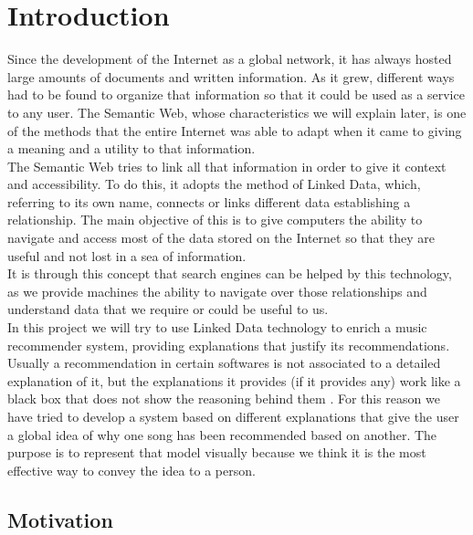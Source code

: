 \chapter{Introduction}
\label{cap:introduction}

Since the development of the Internet as a global network, it has always hosted large amounts of documents and written information. As it grew, different ways had to be found to organize that information so that it could be used as a service to any user. The Semantic Web, whose characteristics we will explain later, is one of the methods that the entire Internet was able to adapt when it came to giving a meaning and a utility to that information.\\

The Semantic Web tries to link all that information in order to give it context and accessibility. To do this, it adopts the method of Linked Data, which, referring to its own name, connects or links different data establishing a relationship. The main objective of this is to give computers the ability to navigate and access most of the data stored on the Internet so that they are useful and not lost in a sea of information.\\

It is through this concept that search engines can be helped by this technology, as we provide machines the ability to navigate over those relationships and understand data that we require or could be useful to us.\\

In this project we will try to use Linked Data technology to enrich a music recommender system, providing explanations that justify its recommendations.\\

Usually a recommendation in certain softwares is not associated to a detailed explanation of it, but the explanations it provides (if it provides any) work like a black box that does not show the reasoning behind them \cite{tintarev2011}. For this reason we have tried to develop a system based on different explanations that give the user a global idea of why one song has been recommended based on another. The purpose is to represent that model visually because we think it is the most effective way to convey the idea to a person.\\

\clearpage

\section{Motivation}

